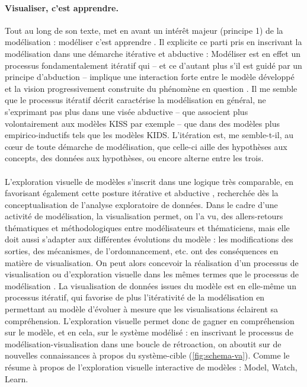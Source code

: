 \paragraph{Visualiser, c'est apprendre.}
Tout au long de son texte, \textcite{banos_pour_2013} met en avant un intérêt majeur (principe 1) de la modélisation : \og modéliser c'est apprendre\fg{} \autocite{banos_modeliser_2016}.
Il explicite ce parti pris en inscrivant la modélisation dans une démarche itérative et abductive :
	\og Modéliser est en effet un processus fondamentalement itératif qui -- et ce d'autant plus s'il est guidé par un principe d'abduction -- implique une interaction forte entre le modèle développé et la vision progressivement construite du phénomène en question\fg{} \autocite[77]{banos_pour_2013}.
Il me semble que le processus itératif décrit caractérise la modélisation en général, ne s'exprimant pas plus dans une visée abductive -- que \textcite{livet2014diversite} associent plus volontairement aux modèles KISS par exemple -- que dans des modèles plus empirico-inductifs tels que les modèles KIDS.
L'itération est, me semble-t-il, au cœur de toute démarche de modélisation, que celle-ci aille des hypothèses aux concepts, des données aux hypothèses, ou encore alterne entre les trois.

\paragraph[Ccl : Modélisation et visualisation]{}
L'exploration visuelle de modèles s'inscrit dans une logique très comparable, en favorisant également cette posture itérative et abductive \autocite[p.~239-240]{banos2005voie}, recherchée dès la conceptualisation de l'analyse exploratoire de données.
Dans le cadre d'une activité de modélisation, la visualisation permet, on l'a vu, des allers-retours thématiques et méthodologiques entre modélisateurs et thématiciens, mais elle doit aussi s'adapter aux différentes évolutions du modèle :
	les modifications des sorties, des mécanismes, de l'ordonnancement, etc. ont des conséquences en matière de visualisation.
On peut alors concevoir la réalisation d'un processus de visualisation ou d'exploration visuelle dans les mêmes termes que le processus de modélisation \autocite{andrienko2018viewing}.
La visualisation de données issues du modèle est en elle-même un processus itératif, qui favorise de plus l'itérativité de la modélisation en permettant au modèle d'évoluer à mesure que les visualisations éclairent sa compréhension.
L'exploration visuelle permet donc de gagner en compréhension sur le modèle, et en cela, sur le système modélisé :
	en inscrivant le processus de modélisation-visualisation dans une boucle de rétroaction, on aboutit sur de nouvelles connaissances à propos du système-cible (\cref{fig:schema-va}).
Comme le résume \textcite{victor_simulation_2009} à propos de l'exploration visuelle interactive de modèles : \og Model, Watch, Learn\fg{}.

